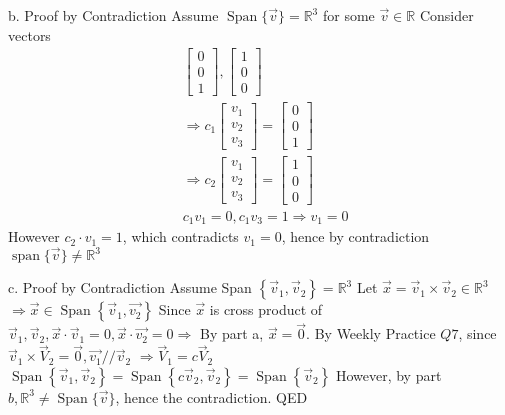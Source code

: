 \documentclass[11pt]{article}
\begin{document}
\begin{enumerate}[{\bf Q1.}]
\begin{enumerate}
		b. Proof by Contradiction \newline
		Assume $\operatorname{Span}\{\vec{v}\}=\mathbb{R}^3$ for some $\vec{v} \in \mathbb{R}$ \newline
		Consider vectors
		$$
		\begin{aligned}
		& {\left[\begin{array}{l}
		0 \\
		0 \\
		1
		\end{array}\right],\left[\begin{array}{l}
		1 \\
		0 \\
		0
		\end{array}\right]} \\
		& \Rightarrow c_1\left[\begin{array}{l}
		v_1 \\
		v_2 \\
		v_3
		\end{array}\right]=\left[\begin{array}{l}
		0 \\
		0 \\
		1
		\end{array}\right] \\
		& \Rightarrow c_2\left[\begin{array}{l}
		v_1 \\
		v_2 \\
		v_3
		\end{array}\right]=\left[\begin{array}{l}
		1 \\
		0 \\
		0
		\end{array}\right] \\
		& c_1 v_1=0, c_1 v_3=1 \Rightarrow v_1=0
		\end{aligned}
		$$
		However $c_2 \cdot v_1=1$, which contradicts $v_1=0$, hence by contradiction $\operatorname{span}\{\vec{v}\} \neq \mathbb{R}^3$ 
				
		c. Proof by Contradiction
		Assume Span $\left\{\vec{v}_1, \vec{v}_2\right\}=\mathbb{R}^3$ \newline
		Let $\vec{x}=\vec{v}_1 \times \vec{v}_2 \in \mathbb{R}^3$
		$\Rightarrow \vec{x} \in \operatorname{Span}\left\{\vec{v}_1, \overrightarrow{v_2}\right\}$ \newline
		Since $\vec{x}$ is cross product of $\vec{v}_1, \vec{v}_2, \vec{x} \cdot \vec{v}_1=0, \vec{x} \cdot \overrightarrow{v_2}=0 \Rightarrow$
		By part a, $\vec{x}=\overrightarrow{0}$. \newline
		By Weekly Practice $Q 7$, since $\vec{v}_1 \times \vec{V}_2=\overrightarrow{0}, \overrightarrow{v_1} / / \vec{v}_2$
		$\Rightarrow \vec{V}_1=c \vec{V}_2$
		$\operatorname{Span}\left\{\vec{v}_1, \vec{v}_2\right\}=\operatorname{Span}\left\{c \vec{v}_2, \vec{v}_2\right\}=\operatorname{Span}\left\{\vec{v}_2\right\}$ \newline
		However, by part $b, \mathbb{R}^3 \neq \operatorname{Span}\{\vec{v}\}$,
		hence the contradiction. \newline
		QED
	\end{enumerate}
	

\end{enumerate}
\end{document}
